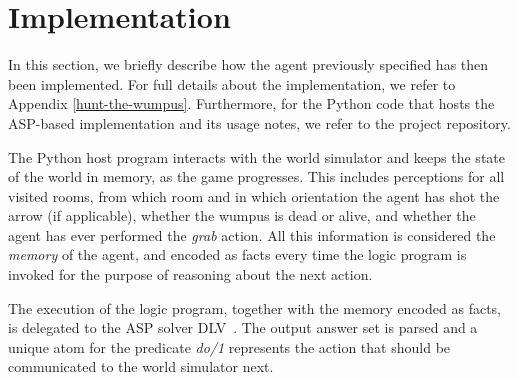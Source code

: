 \documentclass{llncs}
\begin{document}

\section{Implementation}

In this section, we briefly describe how the agent previously specified has then been implemented.
For full details about the implementation, we refer to Appendix \ref{hunt-the-wumpus}.
Furthermore, for the Python code that hosts the ASP-based implementation and its usage notes, we refer to the project repository.

The Python host program interacts with the world simulator and keeps the state of the world in memory, as the game progresses. This includes perceptions for all visited rooms, from which room and in which orientation the agent has shot the arrow (if applicable), whether the wumpus is dead or alive, and whether the agent has ever performed the \emph{grab} action. All this information is considered the \emph{memory} of the agent, and encoded as facts every time the logic program is invoked for the purpose of reasoning about the next action.

The execution of the logic program, together with the memory encoded as facts, is delegated to the ASP solver DLV~\cite{DLV-system}.
The output answer set is parsed and a unique atom for the predicate \emph{do/1} represents the action that should be communicated to the world simulator next.
\end{document}
